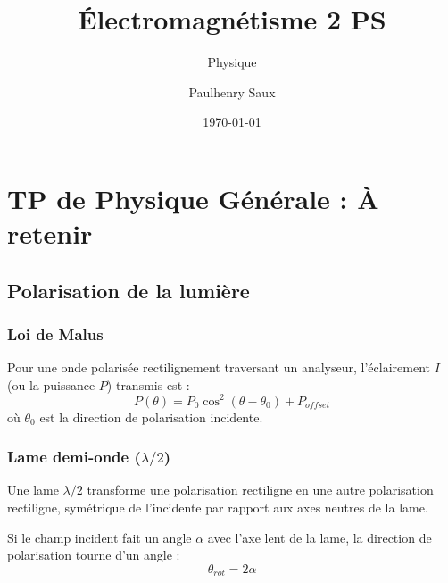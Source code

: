 \documentclass[french]{yLectureNote}
\title{Électromagnétisme 2 PS}
\subtitle{Physique}
\author{Paulhenry Saux}
\date{\today}
\begin{document}
\chapter{TP de Physique Générale : À retenir}
\section{Polarisation de la lumière}
\subsection{Loi de Malus}

\begin{theorem}
    Pour une onde polarisée rectilignement traversant un analyseur, l'éclairement $I$ (ou la puissance $P$) transmis est :
$$P(\theta) = P_0 \cos^2(\theta - \theta_0) + P_{offset}$$
où $\theta_0$ est la direction de polarisation incidente.
\end{theorem}


\subsection{Lame demi-onde ($\lambda/2$)}

\begin{proposition}
    Une lame $\lambda/2$ transforme une polarisation rectiligne en une autre polarisation rectiligne, symétrique de l'incidente par rapport aux axes neutres de la lame.

    Si le champ incident fait un angle $\alpha$ avec l'axe lent de la lame, la direction de polarisation tourne d'un angle : 
$$\theta_{rot} = 2\alpha$$
\end{proposition}
\end{document}
